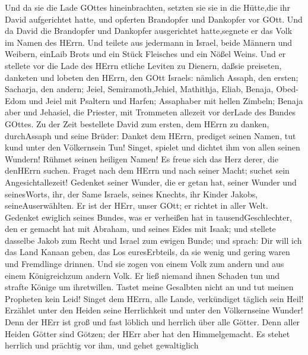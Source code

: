  Und da sie die Lade GOttes hineinbrachten, setzten sie sie
in die Hütte,die ihr David aufgerichtet hatte, und opferten Brandopfer
und Dankopfer vor GOtt.  Und da David die Brandopfer und
Dankopfer ausgerichtet hatte,segnete er das Volk im Namen des HErrn.
 Und teilete aus jedermann in Israel, beide Männern und
Weibern, einLaib Brots und ein Stück Fleisches und ein Nößel Weins.
 Und er stellete vor die Lade des HErrn etliche Leviten zu
Dienern, daßsie preiseten, danketen und lobeten den HErrn, den GOtt
Israels:  nämlich Assaph, den ersten; Sacharja, den andern;
Jeiel, Semiramoth,Jehiel, Mathithja, Eliab, Benaja, Obed-Edom und Jeiel
mit Psaltern und Harfen; Assaphaber mit hellen Zimbeln; 
Benaja aber und Jehasiel, die Priester, mit Trommeten allezeit vor
derLade des Bundes GOttes.  Zu der Zeit bestellete David zum
ersten, dem HErrn zu danken, durchAssaph und seine Brüder: 
Danket dem HErrn, prediget seinen Namen, tut kund unter den Völkernsein
Tun!  Singet, spielet und dichtet ihm von allen seinen
Wundern!  Rühmet seinen heiligen Namen! Es freue sich das
Herz derer, die denHErrn suchen.  Fraget nach dem HErrn und
nach seiner Macht; suchet sein Angesichtallezeit!  Gedenket
seiner Wunder, die er getan hat, seiner Wunder und seinesWorts,
 ihr, der Same Israels, seines Knechts, ihr Kinder Jakobs,
seineAuserwählten.  Er ist der HErr, unser GOtt; er richtet
in aller Welt.  Gedenket ewiglich seines Bundes, was er
verheißen hat in tausendGeschlechter,  den er gemacht hat
mit Abraham, und seines Eides mit Isaak;  und stellete
dasselbe Jakob zum Recht und Israel zum ewigen Bunde;  und
sprach: Dir will ich das Land Kanaan geben, das Los euresErbteils,
 da sie wenig und gering waren und Fremdlinge drinnen.
 Und sie zogen von einem Volk zum andern und aus einem
Königreichzum andern Volk.  Er ließ niemand ihnen Schaden
tun und strafte Könige um ihretwillen.  Tastet meine
Gesalbten nicht an und tut meinen Propheten kein Leid! 
Singet dem HErrn, alle Lande, verkündiget täglich sein Heil!
 Erzählet unter den Heiden seine Herrlichkeit und unter den
Völkernseine Wunder!  Denn der HErr ist groß und fast
löblich und herrlich über alle Götter.  Denn aller Heiden
Götter sind Götzen; der HErr aber hat den Himmelgemacht. 
Es stehet herrlich und prächtig vor ihm, und gehet gewaltiglich
